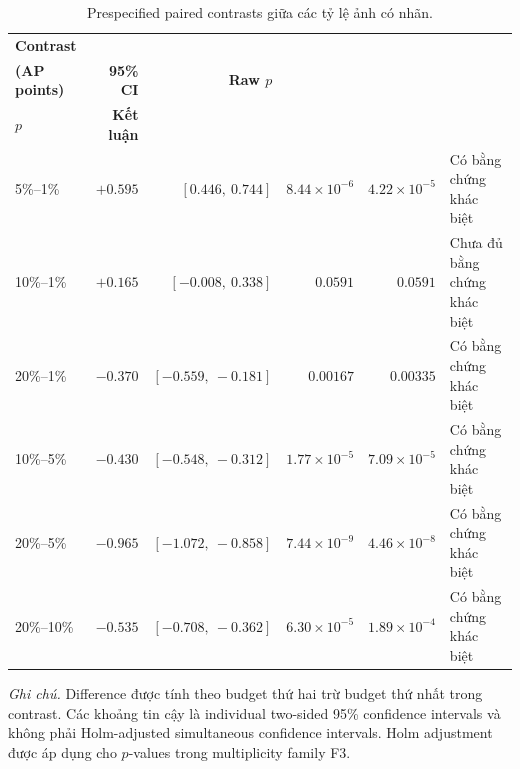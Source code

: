 \documentclass[pdflatex,sn-mathphys-num]{sn-jnl}%
\theoremstyle{thmstyleone}%
\theoremstyle{thmstyletwo}%
\theoremstyle{thmstylethree}%
\begin{document}
\begin{table}[htbp]
    \centering
    \caption{Prespecified paired contrasts giữa các tỷ lệ ảnh có nhãn.}
    \label{tab:sq1_pairwise_contrasts}
    \small

    \setlength{\tabcolsep}{4pt}

    \begin{tabularx}{\textwidth}{
        l
        >{\centering\arraybackslash}r
        >{\centering\arraybackslash}r
        >{\centering\arraybackslash}r
        >{\centering\arraybackslash}r
        >{\raggedright\arraybackslash}X
    }
        \toprule

        \textbf{Contrast} &
        \makecell{\textbf{Difference}\\\textbf{(AP points)}} &
        \textbf{95\% CI} &
        \textbf{Raw $p$} &
        \makecell{\textbf{Holm F3}\\\textbf{$p$}} &
        \textbf{Kết luận} \\

        \midrule

        5\%--1\% &
        $+0.595$ &
        $[0.446,\ 0.744]$ &
        $8.44\times10^{-6}$ &
        $4.22\times10^{-5}$ &
        Có bằng chứng khác biệt \\

        10\%--1\% &
        $+0.165$ &
        $[-0.008,\ 0.338]$ &
        $0.0591$ &
        $0.0591$ &
        Chưa đủ bằng chứng khác biệt \\

        20\%--1\% &
        $-0.370$ &
        $[-0.559,\ -0.181]$ &
        $0.00167$ &
        $0.00335$ &
        Có bằng chứng khác biệt \\

        10\%--5\% &
        $-0.430$ &
        $[-0.548,\ -0.312]$ &
        $1.77\times10^{-5}$ &
        $7.09\times10^{-5}$ &
        Có bằng chứng khác biệt \\

        20\%--5\% &
        $-0.965$ &
        $[-1.072,\ -0.858]$ &
        $7.44\times10^{-9}$ &
        $4.46\times10^{-8}$ &
        Có bằng chứng khác biệt \\

        20\%--10\% &
        $-0.535$ &
        $[-0.708,\ -0.362]$ &
        $6.30\times10^{-5}$ &
        $1.89\times10^{-4}$ &
        Có bằng chứng khác biệt \\

        \bottomrule
    \end{tabularx}

    \setlength{\tabcolsep}{6pt}

    \vspace{0.4em}

    \parbox{0.96\linewidth}{\footnotesize
    \textit{Ghi chú.}
    Difference được tính theo budget thứ hai trừ budget thứ nhất trong contrast.
    Các khoảng tin cậy là individual two-sided 95\% confidence intervals và
    không phải Holm-adjusted simultaneous confidence intervals.
    Holm adjustment được áp dụng cho $p$-values trong multiplicity family F3.}

\end{table}
\end{document}
